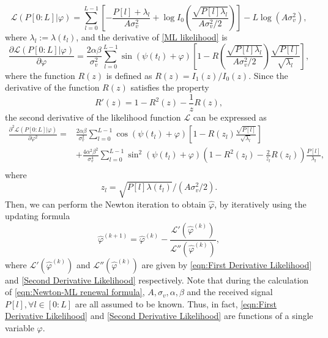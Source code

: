 \documentclass[12pt,draftclsnofoot,journal,onecolumn]{IEEEtran}
\theoremstyle{nonumberplain}
\begin{document}
    \begin{equation}
        \mathcal{L}(P[0:L] | \varphi) = \sum_{l=0}^{L-1}\left[-\frac{P[l] + \lambda_l}{A\sigma_v^2} + \log I_0\left(\frac{\sqrt{P[l] \lambda_l}}{A\sigma_v^2/2}\right)\right] - L\log(A\sigma_v^2),
        \label{ML likelihood}
    \end{equation}
    where $\lambda_l := \lambda(t_l)$, and the derivative of \eqref{ML likelihood} is 
    \begin{equation}
        \frac{\partial \mathcal{L}(P[0:L] | \varphi)}{\partial \varphi} = \frac{2\alpha\beta}{\sigma_v^2}\sum_{l=0}^{L-1}\sin(\psi(t_l)+\varphi) \left[1 - R\left( \frac{\sqrt{P[l]\lambda_l}}{A\sigma_v^2/2} \right) \frac{\sqrt{P[l]}}{\sqrt{\lambda_l}}\right],
        \label{eqn:First Derivative Likelihood}
    \end{equation}
    where the function $R(z)$ is defined as $R(z) = I_1(z)/I_0(z)$. Since the derivative of the function $R(z)$ satisfies the property \cite{silverman1972special}
    \begin{equation}
        R'(z)=1-R^2(z)-\frac{1}{z}R(z),
        \label{eqn:R function derivative property}
    \end{equation}
    the second derivative of the likelihood function $\mathcal{L}$ can be expressed as
    \begin{equation}
        \begin{aligned}
        \frac{\partial^2 \mathcal{L}(P[0:L] | \varphi)}{\partial \varphi^2}  = &  \frac{2\alpha\beta}{\sigma_v^2} \sum_{l=0}^{L-1}{\cos(\psi(t_l)+\varphi)}\left[1 - R\left(z_l\right) \frac{\sqrt{P[l]}}{\sqrt{\lambda_l}}\right] \\
        & +\frac{4\alpha^2\beta^2}{\sigma_v^4}\sum_{l=0}^{L-1}{\sin^2(\psi(t_l)+\varphi) \left(1-R^2(z_l) -\frac{2}{z_l}R(z_l)\right)\frac{P[l]}{\lambda_l} },\\
        \end{aligned}
        \label{Second Derivative Likelihood}
    \end{equation}
    where
    \begin{equation}
        z_l = \sqrt{P[l]\lambda(t_l)}/(A\sigma_v^2/2).
        \label{eqn:def z_l}
    \end{equation}
    Then, we can perform the Newton iteration to obtain $\hat{\varphi}$, by iteratively using the updating formula
    \begin{equation}
        \hat{\varphi}^{(k+1)} = \hat{\varphi}^{(k)} - \frac{\mathcal{L}'(\hat{\varphi}^{(k)})}{\mathcal{L}''(\hat{\varphi}^{(k)})},
        \label{eqn:Newton-ML renewal formula}
    \end{equation}
    where $\mathcal{L}'(\hat{\varphi}^{(k)})$ and $\mathcal{L}''(\hat{\varphi}^{(k)})$ are given by \eqref{eqn:First Derivative Likelihood} and \eqref{Second Derivative Likelihood} respectively. Note that during the calculation of \eqref{eqn:Newton-ML renewal formula}, $A, \sigma_v, \alpha, \beta$ and the received signal $P[l], \forall l\in [0:L]$ are all assumed to be known. Thus, in fact,  \eqref{eqn:First Derivative Likelihood} and \eqref{Second Derivative Likelihood} are functions of a single variable $\varphi$. 
\end{document}
